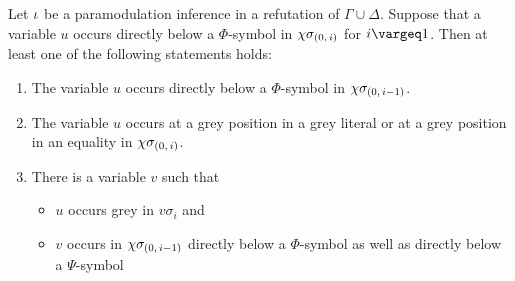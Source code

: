 \documentclass[,%
	draft=false,%
	numbers=noendperiod
	12pt,
	a4paper,
	oneside,%
	openany,
]{memoir}
\newcommand{\inv}{\ensuremath{\chi}}
\begin{document}
\begin{lemma}
	\label{lemma:var_below_phi_symbol_paramod}
	Let $\iota$ be a paramodulation inference in a refutation of $\Gamma\cup\Delta$.
	Suppose that a variable $u$ occurs directly below a $\Phi$-symbol in $\inv\sigmazi$ for $i\vargeq 1$.
	Then at least one of the following statements holds:
	\begin{enumerate}
		\item
			\label{15_1}
			The variable $u$ occurs directly below a $\Phi$-symbol in $\inv\sigmazmi$.

		\item
			\label{15_5}
			The variable $u$ occurs at a grey position in a grey literal or at a grey position in an equality in $\inv\sigmazi$.

		\item 
			\label{15_2}
			There is a variable $v$ such that 
			{
				\renewcommand{\labelitemi}{\textendash}
				\begin{itemize}
					\item $u$ occurs grey in $v\sigma_i$ and
					\item $v$ occurs in $\inv\sigmazmi$ directly below a $\Phi$-symbol as well as directly below a $\Psi$-symbol
				\end{itemize}
			}


	\end{enumerate}
\end{lemma}
\end{document}
